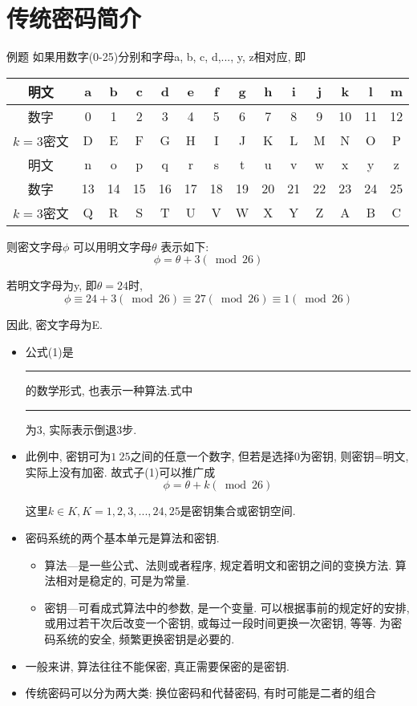 \documentclass[UTF8]{ctexart}
\newcommand\hl{\bgroup\markoverwith
  {\textcolor{yellow}{\rule[-.5ex]{2pt}{2.5ex}}}\ULon}
\begin{document}
\section{传统密码简介}
例题 如果用数字(0-25)分别和字母a, b, c, d,..., y, z相对应, 即

    \begin{tabular}{|c|c|c|c|c|c|c|c|c|c|c|c|c|c|} %
        \hline
        明文& a& b& c& d& e& f& g& h& i& j& k& l& m\\
        \hline
        数字& 0& 1& 2& 3& 4& 5& 6& 7& 8& 9& 10& 11& 12\\
        \hline
        $k=3$密文& D& E& F& G& H& I& J& K& L& M& N& O& P\\
        \hline
        \hline
        明文& n& o& p& q& r& s& t& u& v& w& x& y& z\\
        \hline
        数字& 13& 14& 15& 16& 17& 18& 19& 20& 21& 22& 23& 24& 25\\
        \hline
        $k=3$密文& Q& R& S& T& U& V& W& X& Y& Z& A& B& C\\
        \hline
    \end{tabular}

    则密文字母$\phi$ 可以用明文字母$\theta$ 表示如下:
    \begin{equation}
        \phi = \theta + 3(\bmod26)
    \end{equation}

    若明文字母为y, 即$\theta = 24$时,
    $$\phi \equiv 24 + 3(\bmod26) \equiv 27(\bmod26) \equiv 1(\bmod26)$$

    因此, 密文字母为E.


    \begin{itemize}
        \renewcommand{\labelitemi}{\scriptsize$\blacksquare$}
        \item 公式(1)是\hl{凯撒密码}的数学形式, 也表示一种算法.式中\hl{密钥}为3, 实际表示倒退3步.
        \item 此例中, 密钥可为$1~ 25$之间的任意一个数字, 但若是选择0为密钥, 则密钥=明文, 实际上没有加密. 故式子(1)可以推广成
        $$\phi = \theta + k(\bmod 26)$$

        这里$k\in K, K={1, 2, 3,..., 24, 25}$是密钥集合或密钥空间.

        \item 密码系统的两个基本单元是算法和密钥.
        \begin{itemize}
            \item 算法---是一些公式、法则或者程序, 规定着明文和密钥之间的变换方法. 算法相对是稳定的, 可是为常量.
            \item 密钥---可看成式算法中的参数, 是一个变量. 可以根据事前的规定好的安排, 或用过若干次后改变一个密钥, 或每过一段时间更换一次密钥, 等等. 为密码系统的安全, 频繁更换密钥是必要的.
        \end{itemize}
        \item 一般来讲, 算法往往不能保密, 真正需要保密的是密钥.
        \item 传统密码可以分为两大类: 换位密码和代替密码, 有时可能是二者的组合
    \end{itemize}
\end{document}
